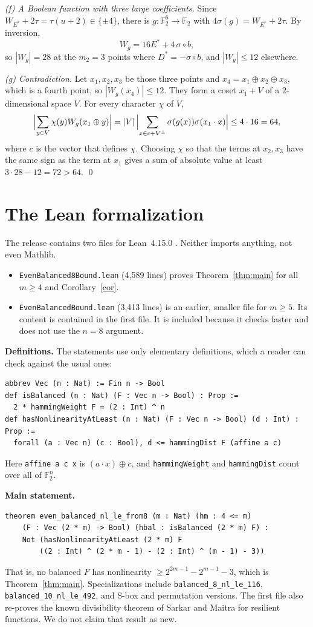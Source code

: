 \documentclass[11pt]{amsart}
\theoremstyle{remark}
\newcommand{\F}{\mathbb{F}_2}
\newcommand{\W}{W}
\newcommand{\sg}{\sigma}
\begin{document}
\emph{(f) A Boolean function with three large coefficients.} Since
$\W_{E^*}+2\tau=\tau(u+2)\in\{\pm4\}$, there is $g:\F^6\to\F$ with
$4\sg(g)=\W_{E^*}+2\tau$. By inversion,
\[
  \W_g=16E^*+4\,\sg\circ b ,
\]
so $|\W_g|=28$ at the $m_2=3$ points where $D^*=-\sg\circ b$, and $|\W_g|\le12$ elsewhere.

\emph{(g) Contradiction.} Let $x_1,x_2,x_3$ be those three points and $x_4=x_1\oplus x_2\oplus x_3$,
which is a fourth point, so $|\W_g(x_4)|\le12$. They form a coset $x_1+V$ of a
$2$-dimensional space $V$. For every character $\chi$ of $V$,
\[
  \Bigl|\sum_{y\in V}\chi(y)\W_g(x_1\oplus y)\Bigr|=|V|\,\Bigl|\sum_{x\in c+V^\perp}\sg(g(x))\sg(x_1\cdot x)\Bigr|\le 4\cdot16=64 ,
\]
where $c$ is the vector that defines $\chi$. Choosing $\chi$ so that the terms at $x_2,x_3$ have the
same sign as the term at $x_1$ gives a sum of absolute value at least $3\cdot28-12=72>64$. \qed

\section{The Lean formalization}\label{sec:lean}

The release contains two files for Lean~4.15.0 \cite{Lean4}. Neither imports anything, not even
Mathlib.
\begin{itemize}[leftmargin=1.5em]
\item \texttt{EvenBalanced8Bound.lean} (4{,}589 lines) proves Theorem~\ref{thm:main} for all
$m\ge4$ and Corollary~\ref{cor}.
\item \texttt{EvenBalancedBound.lean} (3{,}413 lines) is an earlier, smaller file for $m\ge5$.
Its content is contained in the first file. It is included because it checks faster and does
not use the $n=8$ argument.
\end{itemize}

\noindent\textbf{Definitions.} The statements use only elementary definitions, which a reader
can check against the usual ones:
\begin{verbatim}
abbrev Vec (n : Nat) := Fin n -> Bool
def isBalanced (n : Nat) (F : Vec n -> Bool) : Prop :=
  2 * hammingWeight F = (2 : Int) ^ n
def hasNonlinearityAtLeast (n : Nat) (F : Vec n -> Bool) (d : Int) : Prop :=
  forall (a : Vec n) (c : Bool), d <= hammingDist F (affine a c)
\end{verbatim}
Here \texttt{affine a c x} is $(a\cdot x)\oplus c$, and \texttt{hammingWeight} and
\texttt{hammingDist} count over all of $\F^n$.

\noindent\textbf{Main statement.}
\begin{verbatim}
theorem even_balanced_nl_le_from8 (m : Nat) (hm : 4 <= m)
    (F : Vec (2 * m) -> Bool) (hbal : isBalanced (2 * m) F) :
    Not (hasNonlinearityAtLeast (2 * m) F
        ((2 : Int) ^ (2 * m - 1) - (2 : Int) ^ (m - 1) - 3))
\end{verbatim}
That is, no balanced $F$ has nonlinearity $\ge 2^{2m-1}-2^{m-1}-3$, which is
Theorem~\ref{thm:main}. Specializations include \texttt{balanced\_8\_nl\_le\_116},
\texttt{balanced\_10\_nl\_le\_492}, and S-box and permutation versions. The first file also
re-proves the known divisibility theorem of Sarkar and Maitra \cite{SM00} for resilient
functions. We do not claim that result as new.
\end{document}
